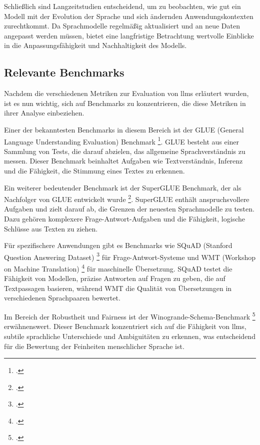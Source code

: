 Schließlich sind Langzeitstudien entscheidend, um zu beobachten, wie gut ein Modell mit der Evolution der Sprache und sich ändernden Anwendungskontexten zurechtkommt. Da Sprachmodelle regelmäßig aktualisiert und an neue Daten angepasst werden müssen, bietet eine langfristige Betrachtung wertvolle Einblicke in die Anpassungsfähigkeit und Nachhaltigkeit des Modells.

\subsection{Relevante Benchmarks} \label{sec:exbenchmarks}
Nachdem die verschiedenen Metriken zur Evaluation von \acp{llm} erläutert wurden, ist es nun wichtig, sich auf Benchmarks zu konzentrieren, die diese Metriken in ihrer Analyse einbeziehen.

Einer der bekanntesten Benchmarks in diesem Bereich ist der GLUE (General Language Understanding Evaluation) Benchmark \footcite[Vgl.][S. 1]{wang2019glue}.
GLUE besteht aus einer Sammlung von Tests, die darauf abzielen, das allgemeine Sprachverständnis zu messen.
Dieser Benchmark beinhaltet Aufgaben wie Textverständnis, Inferenz und die Fähigkeit, die Stimmung eines Textes zu erkennen.

Ein weiterer bedeutender Benchmark ist der SuperGLUE Benchmark, der als Nachfolger von GLUE entwickelt wurde \footcite[Vgl.][S. 1]{sarlin2020superglue}.
SuperGLUE enthält anspruchsvollere Aufgaben und zielt darauf ab, die Grenzen der neuesten Sprachmodelle zu testen. Dazu gehören komplexere Frage-Antwort-Aufgaben und die Fähigkeit, logische Schlüsse aus Texten zu ziehen.

Für spezifischere Anwendungen gibt es Benchmarks wie SQuAD (Stanford Question Answering Dataset) \footcite[Vgl.][S. 1]{rajpurkar2016squad} für Frage-Antwort-Systeme und WMT (Workshop on Machine Translation) \footcite[Vgl.][S. 1]{birch2018findings} für maschinelle Übersetzung.
SQuAD testet die Fähigkeit von Modellen, präzise Antworten auf Fragen zu geben, die auf Textpassagen basieren, während WMT die Qualität von Übersetzungen in verschiedenen Sprachpaaren bewertet.

Im Bereich der Robustheit und Fairness ist der Winogrande-Schema-Benchmark \footcite[Vgl.][S. 1]{sakaguchi2019winogrande} erwähnenswert. Dieser Benchmark konzentriert sich auf die Fähigkeit von \acp{llm}, subtile sprachliche Unterschiede und Ambiguitäten zu erkennen, was entscheidend für die Bewertung der Feinheiten menschlicher Sprache ist.



